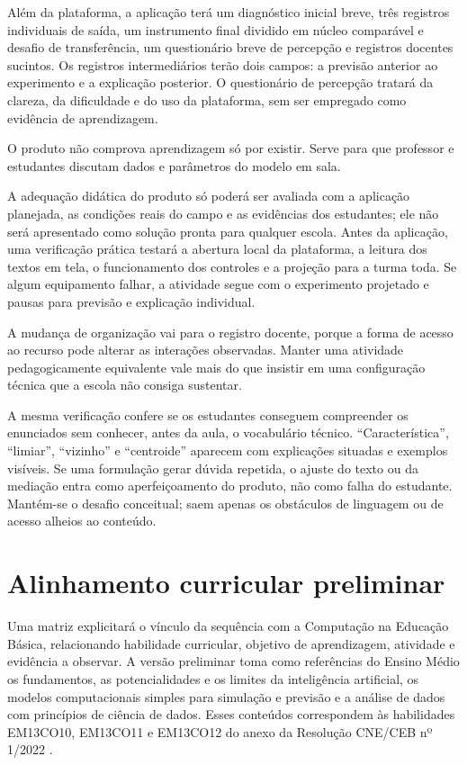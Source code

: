 Além da plataforma, a aplicação terá um diagnóstico inicial breve, três registros individuais de saída, um instrumento final dividido em núcleo comparável e desafio de transferência, um questionário breve de percepção e registros docentes sucintos. Os registros intermediários terão dois campos: a previsão anterior ao experimento e a explicação posterior. O questionário de percepção tratará da clareza, da dificuldade e do uso da plataforma, sem ser empregado como evidência de aprendizagem.

O produto não comprova aprendizagem só por existir. Serve para que professor e estudantes discutam dados e parâmetros do modelo em sala.

A adequação didática do produto só poderá ser avaliada com a aplicação planejada, as condições reais do campo e as evidências dos estudantes; ele não será apresentado como solução pronta para qualquer escola. Antes da aplicação, uma verificação prática testará a abertura local da plataforma, a leitura dos textos em tela, o funcionamento dos controles e a projeção para a turma toda. Se algum equipamento falhar, a atividade segue com o experimento projetado e pausas para previsão e explicação individual.

A mudança de organização vai para o registro docente, porque a forma de acesso ao recurso pode alterar as interações observadas. Manter uma atividade pedagogicamente equivalente vale mais do que insistir em uma configuração técnica que a escola não consiga sustentar.

A mesma verificação confere se os estudantes conseguem compreender os enunciados sem conhecer, antes da aula, o vocabulário técnico. ``Característica'', ``limiar'', ``vizinho'' e ``centroide'' aparecem com explicações situadas e exemplos visíveis. Se uma formulação gerar dúvida repetida, o ajuste do texto ou da mediação entra como aperfeiçoamento do produto, não como falha do estudante. Mantém-se o desafio conceitual; saem apenas os obstáculos de linguagem ou de acesso alheios ao conteúdo.

\section{Alinhamento curricular preliminar}

Uma matriz explicitará o vínculo da sequência com a Computação na Educação Básica, relacionando habilidade curricular, objetivo de aprendizagem, atividade e evidência a observar. A versão preliminar toma como referências do Ensino Médio os fundamentos, as potencialidades e os limites da inteligência artificial, os modelos computacionais simples para simulação e previsão e a análise de dados com princípios de ciência de dados. Esses conteúdos correspondem às habilidades EM13CO10, EM13CO11 e EM13CO12 do anexo da Resolução CNE/CEB nº 1/2022 \cite{brasil2022computacao}.

